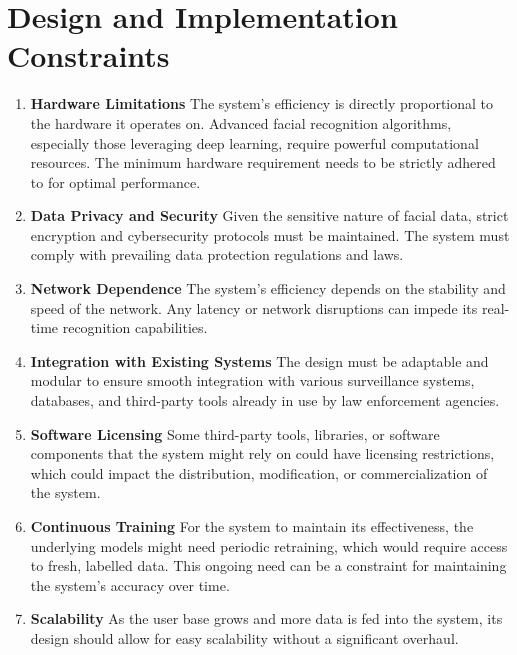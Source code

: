 \documentclass{scrreprt}
\begin{document}
    \section{Design and Implementation Constraints}
        \begin{enumerate}
            \item \textbf{Hardware Limitations}
            The system's efficiency is directly proportional to the hardware it operates on. Advanced facial recognition algorithms, especially those leveraging deep learning, require powerful computational resources. The minimum hardware requirement needs to be strictly adhered to for optimal performance.
            \item \textbf{Data Privacy and Security}
            Given the sensitive nature of facial data, strict encryption and cybersecurity protocols must be maintained. The system must comply with prevailing data protection regulations and laws.
            \item \textbf{Network Dependence}
            The system's efficiency depends on the stability and speed of the network. Any latency or network disruptions can impede its real-time recognition capabilities.
            \item \textbf{Integration with Existing Systems}
            The design must be adaptable and modular to ensure smooth integration with various surveillance systems, databases, and third-party tools already in use by law enforcement agencies.
            \item \textbf{Software Licensing}
            Some third-party tools, libraries, or software components that the system might rely on could have licensing restrictions, which could impact the distribution, modification, or commercialization of the system.
            \item \textbf{Continuous Training}
            For the system to maintain its effectiveness, the underlying models might need periodic retraining, which would require access to fresh, labelled data. This ongoing need can be a constraint for maintaining the system's accuracy over time.
            \item  \textbf{Scalability}
            As the user base grows and more data is fed into the system, its design should allow for easy scalability without a significant overhaul.
        \end{enumerate}
    
\end{document}
